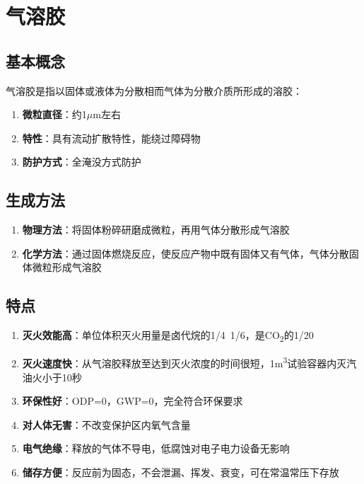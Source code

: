 \documentclass[12pt,UTF8]{ctexbook}
\begin{document}
\chapter{气溶胶}

\section{基本概念}

气溶胶是指以固体或液体为分散相而气体为分散介质所形成的溶胶：

\begin{enumerate}
    \item \textbf{微粒直径}：约1\(\mu\)m左右
    \item \textbf{特性}：具有流动扩散特性，能绕过障碍物
    \item \textbf{防护方式}：全淹没方式防护
\end{enumerate}

\section{生成方法}

\begin{enumerate}
    \item \textbf{物理方法}：将固体粉碎研磨成微粒，再用气体分散形成气溶胶
    
    \item \textbf{化学方法}：通过固体燃烧反应，使反应产物中既有固体又有气体，气体分散固体微粒形成气溶胶
\end{enumerate}

\section{特点}

\begin{enumerate}
    \item \textbf{灭火效能高}：单位体积灭火用量是卤代烷的1/4~1/6，是CO\textsubscript{2}的1/20
    
    \item \textbf{灭火速度快}：从气溶胶释放至达到灭火浓度的时间很短，1m\textsuperscript{3}试验容器内灭汽油火小于10秒
    
    \item \textbf{环保性好}：ODP=0，GWP=0，完全符合环保要求
    
    \item \textbf{对人体无害}：不改变保护区内氧气含量
    
    \item \textbf{电气绝缘}：释放的气体不导电，低腐蚀对电子电力设备无影响
    
    \item \textbf{储存方便}：反应前为固态，不会泄漏、挥发、衰变，可在常温常压下存放
\end{enumerate}
\end{document}
